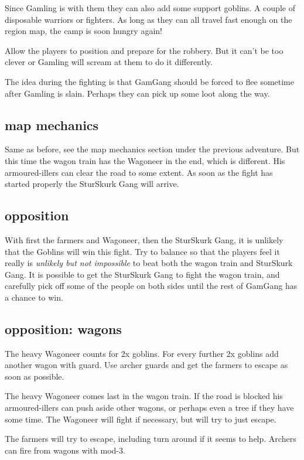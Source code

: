 Since Gamling is with them they can also add some support goblins. A couple of disposable warriors or fighters. As long as they can all travel fast enough on the region map, the camp is soon hungry again!

Allow the players to position and prepare for the robbery. But it can't be too clever or Gamling will scream at them to do it differently.

The idea during the fighting is that GamGang should be forced to flee sometime after Gamling is slain. Perhaps they can pick up some loot along the way.


\subsection*{map mechanics}

Same as before, see the map mechanics section under the previous adventure.
But this time the wagon train has the Wagoneer in the end, which is different. His armoured-illers can clear the road to some extent.
As soon as the fight has started properly the SturSkurk Gang will arrive.


\subsection*{opposition}

With first the farmers and Wagoneer, then the SturSkurk Gang, it is unlikely that the Goblins will win this fight. Try to balance so that the players feel it really is \emph{unlikely but not impossible} to beat both the wagon train and SturSkurk Gang. It is possible to get the SturSkurk Gang to fight the wagon train, and carefully pick off some of the people on both sides until the rest of GamGang has a chance to win.


\subsection*{opposition: wagons}

The heavy Wagoneer  counts for 2x goblins. For every further 2x goblins add another wagon with guard. Use archer guards and get the farmers to escape as soon as possible.

The heavy Wagoneer comes last in the wagon train. If the road is blocked his armoured-illers can push aside other wagons, or perhaps even a tree if they have some time. The Wagoneer will fight if necessary, but will try to just escape.

The farmers will try to escape, including turn around if it seems to help. Archers can fire from wagons with mod-3.



